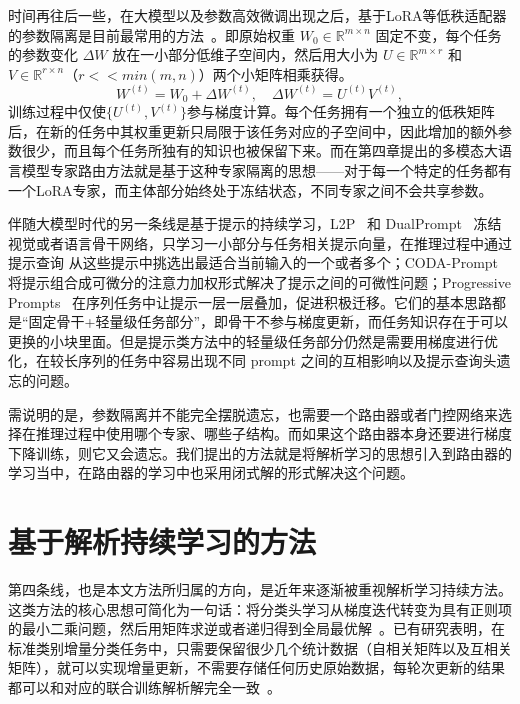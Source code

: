 时间再往后一些，在大模型以及参数高效微调出现之后，基于LoRA等低秩适配器的参数隔离是目前最常用的方法~\citep{hu2021lora, wang2023orthogonal, chen2024coin, wang2025llm_cl_zh}。即原始权重 $W_0 \in \mathbb{R}^{m \times n}$ 固定不变，每个任务的参数变化 $\Delta W$ 放在一小部分低维子空间内，然后用大小为 $U \in \mathbb{R}^{m \times r}$ 和 $V \in \mathbb{R}^{r \times n}$（$r << min(m, n)$）两个小矩阵相乘获得。
\begin{equation}
W^{(t)}=W_0+\Delta W^{(t)},\quad \Delta W^{(t)}=U^{(t)}V^{(t)},
\label{eq:lora_decomp}
\end{equation}
训练过程中仅使$\{U^{(t)}, V^{(t)}\}$参与梯度计算。每个任务拥有一个独立的低秩矩阵后，在新的任务中其权重更新只局限于该任务对应的子空间中，因此增加的额外参数很少，而且每个任务所独有的知识也被保留下来。而在第四章提出的多模态大语言模型专家路由方法就是基于这种专家隔离的思想——对于每一个特定的任务都有一个LoRA专家，而主体部分始终处于冻结状态，不同专家之间不会共享参数。

伴随大模型时代的另一条线是基于提示的持续学习，L2P~\citep{wang2022s} 和 DualPrompt~\citep{wang2022dualprompt} 冻结视觉或者语言骨干网络，只学习一小部分与任务相关提示向量，在推理过程中通过提示查询 从这些提示中挑选出最适合当前输入的一个或者多个；CODA-Prompt~\citep{smith2023coda} 将提示组合成可微分的注意力加权形式解决了提示之间的可微性问题；Progressive Prompts~\citep{razdaibiedina2023progressive} 在序列任务中让提示一层一层叠加，促进积极迁移。它们的基本思路都是“固定骨干+轻量级任务部分”，即骨干不参与梯度更新，而任务知识存在于可以更换的小块里面。但是提示类方法中的轻量级任务部分仍然是需要用梯度进行优化，在较长序列的任务中容易出现不同 prompt 之间的互相影响以及提示查询头遗忘的问题。

需说明的是，参数隔离并不能完全摆脱遗忘，也需要一个路由器或者门控网络来选择在推理过程中使用哪个专家、哪些子结构。而如果这个路由器本身还要进行梯度下降训练，则它又会遗忘。我们提出的方法就是将解析学习的思想引入到路由器的学习当中，在路由器的学习中也采用闭式解的形式解决这个问题。

\section{基于解析持续学习的方法}

第四条线，也是本文方法所归属的方向，是近年来逐渐被重视解析学习持续方法。这类方法的核心思想可简化为一句话：将分类头学习从梯度迭代转变为具有正则项的最小二乘问题，然后用矩阵求逆或者递归得到全局最优解~\citep{zhuang2022acil,zhuang2024dsal}。已有研究表明，在标准类别增量分类任务中，只需要保留很少几个统计数据（自相关矩阵以及互相关矩阵），就可以实现增量更新，不需要存储任何历史原始数据，每轮次更新的结果都可以和对应的联合训练解析解完全一致~\citep{fang2024air,GKEAL_Zhuang_CVPR2023}。

